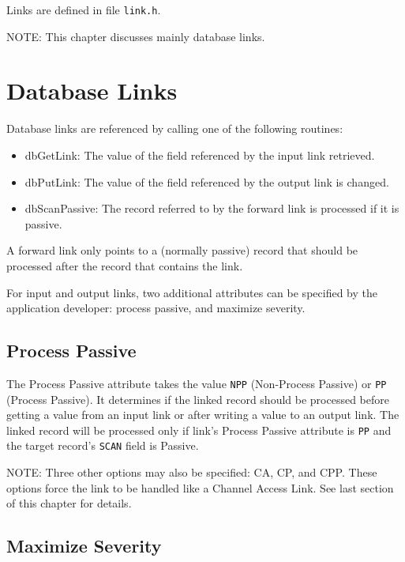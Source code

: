 Links are defined in file \verb|link.h|.

NOTE: This chapter discusses mainly database links.

\section{Database Links}

Database links are referenced by calling one of the following routines:

\begin{itemize}
\item {}dbGetLink:
The value of the field referenced by the input link retrieved.

\item {}dbPutLink:
The value of the field referenced by the output link is changed.

\item {}dbScanPassive:
The record referred to by the forward link is processed if it is passive.

\end{itemize}

A forward link only points to a (normally passive) record that should be processed after the record that contains the link.

For input and output links, two additional attributes can be specified by the application developer: process passive, and maximize severity.

\subsection{Process Passive}

The Process Passive attribute takes the value \verb|NPP| (Non-Process Passive) or \verb|PP| (Process Passive).
It determines if the linked record should be processed before getting a value from an input link or after writing a value to an output link.
The linked record will be processed only if link's Process Passive attribute is \verb|PP| and the target record's \verb|SCAN| field is Passive.

NOTE: Three other options may also be specified:
CA, CP, and CPP. These options force the link to be handled like a Channel Access Link.
See last section of this chapter for details.

\subsection{Maximize Severity}

